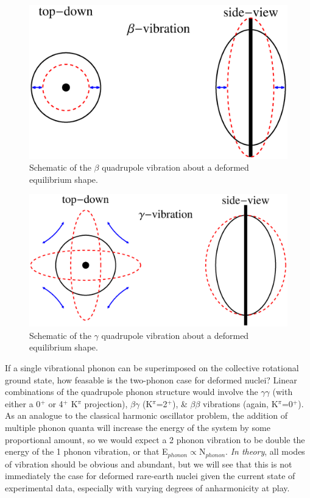 \begin{figure}[h!] 
\begin{center}
\includegraphics[width=\textwidth]{figures/SciDraw_beta_vibration.eps}
\caption{Schematic of the $\beta$ quadrupole vibration about a deformed equilibrium shape.}
\label{fig:beta_vibration}
\end{center}
\end{figure}

\begin{figure}[h!] 
\begin{center}
\includegraphics[width=\textwidth]{figures/SciDraw_gamma_vibration.eps}
\caption{Schematic of the $\gamma$ quadrupole vibration about a deformed equilibrium shape.}
\label{fig:gamma_vibration}
\end{center}
\end{figure}

If a single vibrational phonon can be superimposed on the collective rotational ground state, how feasable is the two-phonon case for deformed nuclei? Linear combinations of the quadrupole phonon structure would involve the $\gamma\gamma$ (with either a 0$^+$ or 4$^+$ K$^\pi$ projection), $\beta\gamma$ (K$^\pi$=2$^+$), \& $\beta\beta$ vibrations (again, K$^\pi$=0$^+$). As an analogue to the classical harmonic oscillator problem, the addition of multiple phonon quanta will increase the energy of the system by some proportional amount, so we would expect a 2 phonon vibration to be double the energy of the 1 phonon vibration, or that E$_{phonon}\propto$N$_{phonon}$. \textit{In theory}, all modes of vibration should be obvious and abundant, but we will see that this is not immediately the case for deformed rare-earth nuclei given the current state of experimental data, especially with varying degrees of anharmonicity at play.

